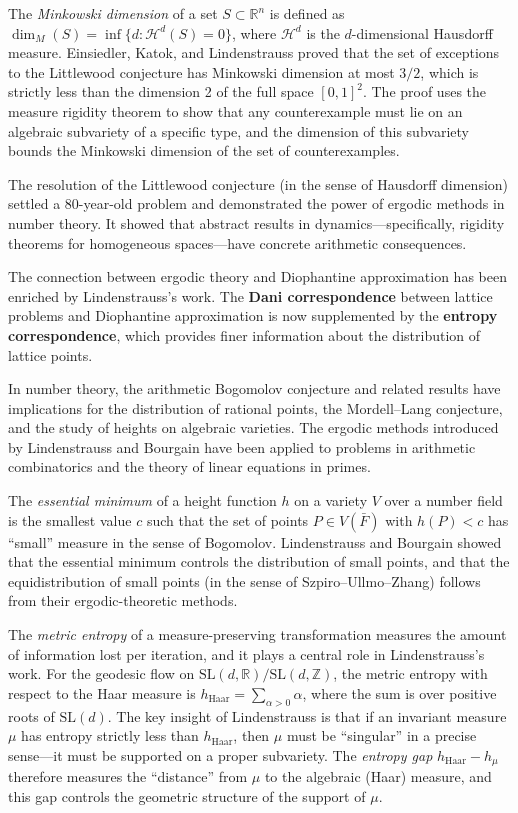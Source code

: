 The \emph{Minkowski dimension} of a set $S \subset \mathbb{R}^n$ is defined as $\dim_M(S) = \inf\{d : \mathcal{H}^d(S) = 0\}$, where $\mathcal{H}^d$ is the $d$-dimensional Hausdorff measure. Einsiedler, Katok, and Lindenstrauss proved that the set of exceptions to the Littlewood conjecture has Minkowski dimension at most $3/2$, which is strictly less than the dimension 2 of the full space $[0,1]^2$. The proof uses the measure rigidity theorem to show that any counterexample must lie on an algebraic subvariety of a specific type, and the dimension of this subvariety bounds the Minkowski dimension of the set of counterexamples.

The resolution of the Littlewood conjecture (in the sense of Hausdorff dimension) settled a 80-year-old problem and demonstrated the power of ergodic methods in number theory. It showed that abstract results in dynamics---specifically, rigidity theorems for homogeneous spaces---have concrete arithmetic consequences.

The connection between ergodic theory and Diophantine approximation has been enriched by Lindenstrauss's work. The \textbf{Dani correspondence} between lattice problems and Diophantine approximation is now supplemented by the \textbf{entropy correspondence}, which provides finer information about the distribution of lattice points.

In number theory, the arithmetic Bogomolov conjecture and related results have implications for the distribution of rational points, the Mordell--Lang conjecture, and the study of heights on algebraic varieties. The ergodic methods introduced by Lindenstrauss and Bourgain have been applied to problems in arithmetic combinatorics and the theory of linear equations in primes.

The \emph{essential minimum} of a height function $h$ on a variety $V$ over a number field is the smallest value $c$ such that the set of points $P \in V(\bar{F})$ with $h(P) < c$ has ``small'' measure in the sense of Bogomolov. Lindenstrauss and Bourgain showed that the essential minimum controls the distribution of small points, and that the equidistribution of small points (in the sense of Szpiro--Ullmo--Zhang) follows from their ergodic-theoretic methods.

The \emph{metric entropy} of a measure-preserving transformation measures the amount of information lost per iteration, and it plays a central role in Lindenstrauss's work. For the geodesic flow on $\text{SL}(d,\mathbb{R})/\text{SL}(d,\mathbb{Z})$, the metric entropy with respect to the Haar measure is $h_{\text{Haar}} = \sum_{\alpha > 0} \alpha$, where the sum is over positive roots of $\text{SL}(d)$. The key insight of Lindenstrauss is that if an invariant measure $\mu$ has entropy strictly less than $h_{\text{Haar}}$, then $\mu$ must be ``singular'' in a precise sense---it must be supported on a proper subvariety. The \emph{entropy gap} $h_{\text{Haar}} - h_\mu$ therefore measures the ``distance'' from $\mu$ to the algebraic (Haar) measure, and this gap controls the geometric structure of the support of $\mu$.

